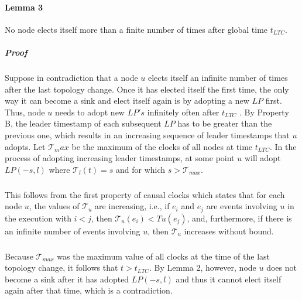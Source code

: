 \paragraph{Lemma 3}No node elects itself more than a finite number of times after global time $t_{LTC}$.
\subparagraph{Proof}Suppose in contradiction that a node $u$ elects itself an infinite number of times after the last topology change. Once it has elected itself the first time, the only way it can become a sink and elect itself again is by adopting a new $LP$ first. Thus, node $u$ needs to adopt new $LP's$ infinitely often after $t_{LTC}$ . By Property B, the leader timestamp of each subsequent $LP$ has to be greater than the previous one, which results in an increasing sequence of leader timestamps that $u$ adopts. Let $\mathcal{T}_max$ be the maximum of the clocks of all nodes at time $t_{LTC}$. In the process of adopting increasing leader timestamps, at some point $u$ will adopt $LP(-s, l)$ where $\mathcal{T} _l (t) = s$ and for which $s > \mathcal{T} _{max}$.
\subparagraph{}This follows from the first property of causal clocks which states that for each node $u$, the values of $\mathcal{T}_u$ are increasing, i.e., if $e_i$ and $e_j$ are events involving $u$ in the execution with $i < j$, then $\mathcal{T} _u (e_i ) < Tu (e_j )$, and, furthermore, if there is an infinite number of events involving $u$, then $\mathcal{T} _u$ increases without bound. 
\subparagraph{}Because $\mathcal{T} _{max}$ was the maximum value of all clocks at the time of the last topology change, it follows that $t > t_{LTC}$. By Lemma 2, however, node $u$ does not become a sink after it has adopted $LP(-s, l)$ and thus it cannot elect itself again after that time, which is a contradiction.
